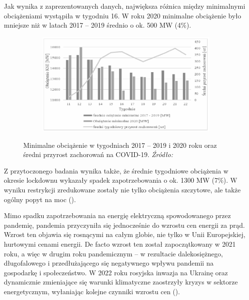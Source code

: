 \documentclass[polish, twoside, 12pt, a4paper]{article}
\theoremstyle{definition}
\theoremstyle{plain}
\theoremstyle{remark}
\begin{document}
Jak wynika z zaprezentowanych danych, największa różnica między minimalnymi obciążeniami wystąpiła w tygodniu 16. W roku 2020 minimalne obciążenie było mniejsze niż w latach 2017 – 2019 średnio o ok. 500 MW (4\%).

\begin{figure}[hbt]
  \centering

  \begin{subfigure}[t]{0.45\textwidth}
    \includegraphics[width=\textwidth]{./figure_8}
  \end{subfigure}

  \captionsetup{margin=10pt,font=small,labelfont=bf,width=.8\textwidth}

  \caption[Minimalne obciążenie w tygodniach 2017 – 2019 i 2020 roku oraz średni przyrost zachorowań na COVID-19]{Minimalne obciążenie w tygodniach 2017 – 2019 i 2020 roku oraz średni przyrost zachorowań na COVID-19. \textit{Źródło:} \cite{stahl2021}}\label{fig:x8}
\end{figure}

Z przytoczonego badania wynika także, że średnie tygodniowe obciążenia w okresie lockdownu wykazały spadek zapotrzebowania o ok. 1300 MW (7\%). W wyniku restrykcji zredukowane zostały nie tylko obciążenia szczytowe, ale także ogólny popyt na moc (\cite{stahl2021}).

Mimo spadku zapotrzebowania na energię elektryczną spowodowanego przez pandemię, pandemia przyczyniła się jednocześnie do wzrostu cen energii za prąd. Wzrost ten objawia się rosnącymi na całym globie, nie tylko w Unii Europejskiej, hurtowymi cenami energii. De facto wzrost ten został zapoczątkowany w 2021 roku, a więc w drugim roku pandemicznym – w rezultacie dalekosiężnego, długofalowego i przedłużającego się negatywnego wpływu pandemii na gospodarkę i społeczeństwo. W 2022 roku rosyjska inwazja na Ukrainę oraz dynamicznie zmieniające się warunki klimatyczne zaostrzyły kryzys w sektorze energetycznym, wyłaniając kolejne czynniki wzrostu cen (\cite{council2023}). 
\end{document}
